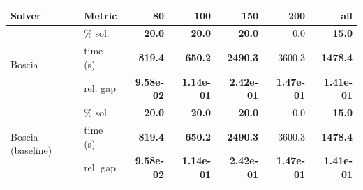 \begin{tabular}{llrrrrr}
\toprule
 Solver & Metric & 80 & 100 & 150 & 200 & all \\
\midrule
\multirow{3}{*}{Boscia} & \% sol. & \textbf{20.0} & \textbf{20.0} & \textbf{20.0} & 0.0 & \textbf{15.0} \\
  & time (s) & \textbf{819.4} & \textbf{650.2} & \textbf{2490.3} & 3600.3 & \textbf{1478.4} \\
  & rel. gap & \textbf{9.58e-02} & \textbf{1.14e-01} & \textbf{2.42e-01} & \textbf{1.47e-01} & \textbf{1.41e-01} \\
\midrule
\multirow{3}{*}{Boscia (baseline)} & \% sol. & \textbf{20.0} & \textbf{20.0} & \textbf{20.0} & 0.0 & \textbf{15.0} \\
  & time (s) & \textbf{819.4} & \textbf{650.2} & \textbf{2490.3} & 3600.3 & \textbf{1478.4} \\
  & rel. gap & \textbf{9.58e-02} & \textbf{1.14e-01} & \textbf{2.42e-01} & \textbf{1.47e-01} & \textbf{1.41e-01} \\
\bottomrule
\end{tabular}

